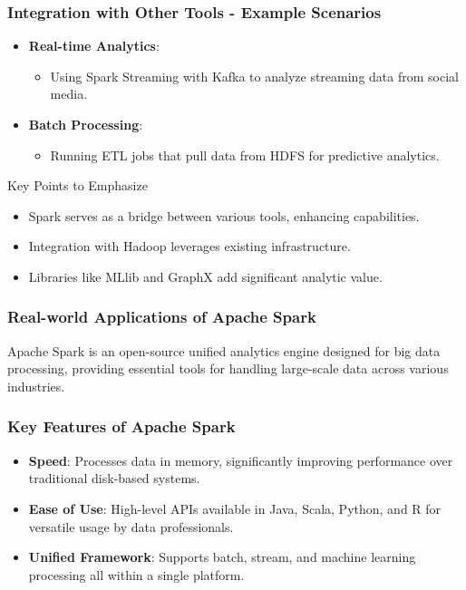 \documentclass[aspectratio=169]{beamer}
\begin{document}
\begin{frame}[fragile]
    \frametitle{Integration with Other Tools - Example Scenarios}
    \begin{itemize}
        \item \textbf{Real-time Analytics}:
            \begin{itemize}
                \item Using Spark Streaming with Kafka to analyze streaming data from social media.
            \end{itemize}
        \item \textbf{Batch Processing}:
            \begin{itemize}
                \item Running ETL jobs that pull data from HDFS for predictive analytics.
            \end{itemize}
    \end{itemize}
    \begin{block}{Key Points to Emphasize}
        \begin{itemize}
            \item Spark serves as a bridge between various tools, enhancing capabilities.
            \item Integration with Hadoop leverages existing infrastructure.
            \item Libraries like MLlib and GraphX add significant analytic value.
        \end{itemize}
    \end{block}
\end{frame}

\begin{frame}[fragile]
    \frametitle{Real-world Applications of Apache Spark}
    Apache Spark is an open-source unified analytics engine designed for big data processing, providing essential tools for handling large-scale data across various industries.
\end{frame}

\begin{frame}[fragile]
    \frametitle{Key Features of Apache Spark}
    \begin{itemize}
        \item \textbf{Speed}: Processes data in memory, significantly improving performance over traditional disk-based systems.
        \item \textbf{Ease of Use}: High-level APIs available in Java, Scala, Python, and R for versatile usage by data professionals.
        \item \textbf{Unified Framework}: Supports batch, stream, and machine learning processing all within a single platform.
    \end{itemize}
\end{frame}
\end{document}
